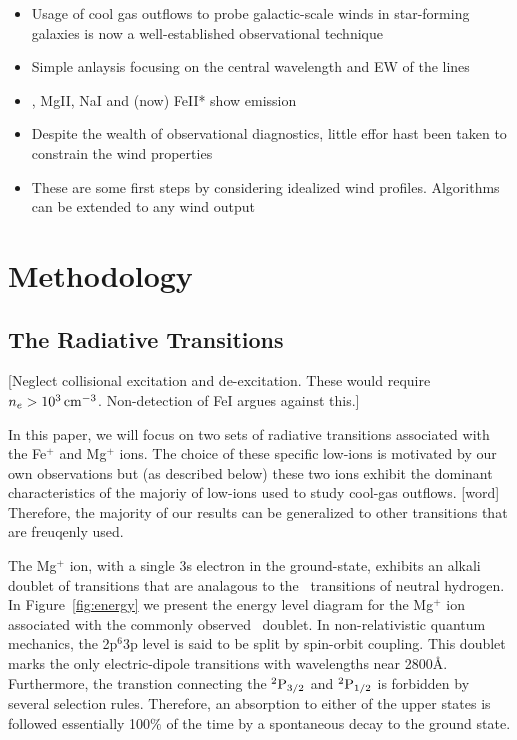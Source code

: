 \documentclass[12pt,preprint]{aastex}
\begin{document}
\begin{itemize}
\item Usage of cool gas outflows to probe galactic-scale winds in
  star-forming galaxies is now a well-established observational
  technique
\item Simple anlaysis focusing on the central wavelength and EW of the
  lines
\item \lya, MgII, NaI and (now) FeII* show emission
\item Despite the wealth of observational diagnostics, little effor
  hast been taken to constrain the wind properties
\item These are some first steps by considering idealized wind
  profiles.  Algorithms can be extended to any wind output
\end{itemize}

\section{Methodology}
\label{sec:method}

\subsection{The Radiative Transitions}

[Neglect collisional excitation and de-excitation.  These would
require $n_e > 10^3 \, {\rm cm^{-3}}$.  Non-detection of FeI argues against
this.]

In this paper, we will focus on two sets of radiative transitions
associated with the Fe$^+$ and Mg$^+$ ions.  The choice of these
specific low-ions is motivated by our own observations
\citep{rubin10b} but (as described below) these two ions exhibit
the dominant characteristics of the majoriy of low-ions used to study
cool-gas outflows. [word] Therefore, the majority of our results can
be generalized to other transitions that are freuqenly used.

The Mg$^+$ ion, with a single 3s electron in the ground-state,
exhibits an alkali doublet of transitions that are analagous to the
\lya\ transitions of neutral hydrogen.  In Figure~\ref{fig:energy}
we present the energy level diagram for the Mg$^+$ ion associated with
the commonly observed \mgiid\ doublet.  In non-relativistic quantum
mechanics, the 2p$^6$3p level is said to be split by spin-orbit
coupling.  This doublet marks the only  electric-dipole transitions
with wavelengths near 2800\AA.  Furthermore, the transtion connecting
the $\rm {}^2P_{3/2}$ and $\rm {}^2P_{1/2}$ is forbidden by several
selection rules.  Therefore, an absorption to either of the upper
states is followed essentially 100$\%$ of the time by a spontaneous decay to the
ground state.  
\end{document}
